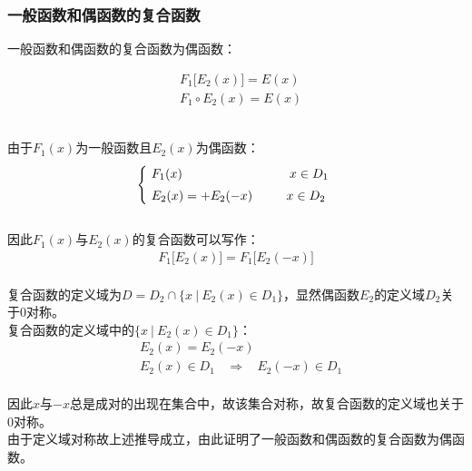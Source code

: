 \documentclass[UTF8]{ctexart}
\begin{document}
\subsubsection{一般函数和偶函数的复合函数}
    \setcounter{equation}{0}
    一般函数和偶函数的复合函数为偶函数：
    \begin{large}
        \begin{align*}
            &F_1\big[E_2(x)\big]=E(x)\\[3mm]
            &F_1\circ E_2(x)=E(x)
        \end{align*}
    \end{large}\\
    由于$F_1(x)$为一般函数且$E_2(x)$为偶函数：
    \begin{align}
        ~~\begin{cases}
            ~F_1(x)\hphantom{=+F_1(-x)}~~~~~~~~~~\hspace{0.5pt}x\in D_1\\[1mm]
            ~E_2(x)=+E_2(-x)~~~~~~~~x\in D_2
        \end{cases}
    \end{align}\\
    因此$F_1(x)$与$E_2(x)$的复合函数可以写作：
    \begin{align}
        F_1\big[E_2(x)\big]=F_1\big[E_2(-x)\big]
    \end{align}\\
    复合函数的定义域为$D=D_2\cap\big\{x~|~E_2(x)\in D_1\big\}$，显然偶函数$E_2$的定义域$D_2$关于$0$对称。\\[3mm]
    复合函数的定义域中的$\big\{x~|~E_2(x)\in D_1\big\}$：\vspace{5pt}
    \begin{align}
        &E_2(x)=E_2(-x)\\[3mm]
        &E_2(x)\in D_1~~~~\Longrightarrow~~~~E_2(-x)\in D_1
    \end{align}\\
    因此$x$与$-x$总是成对的出现在集合中，故该集合对称，故复合函数的定义域也关于$0$对称。\\[3mm]
    由于定义域对称故上述推导成立，由此证明了一般函数和偶函数的复合函数为偶函数。\vspace{8pt}

\newpage
\end{document}
